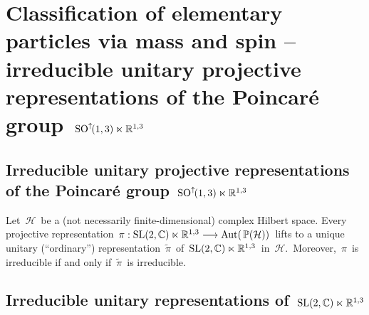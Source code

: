 

\chapter{Classification of elementary particles via mass and spin --
irreducible unitary projective representations of the Poincaré group \,$\textnormal{SO}^{\uparrow\!}(1,3) \ltimes \mathbb{R}^{1,3}$}
\setcounter{theorem}{0}
\setcounter{equation}{0}


\renewcommand{\theenumi}{\roman{enumi}}
\renewcommand{\labelenumi}{\textnormal{(\theenumi)}$\;\;$}


%
%
%
%
\vskip 1.0cm

%


\vskip 0.5cm
\section{Irreducible unitary projective representations of the Poincaré group \,$\textnormal{SO}^{\uparrow\!}(1,3) \ltimes \mathbb{R}^{1,3}$}

\vskip 0.3cm
\begin{theorem}
\mbox{}
\vskip 0.1cm
\noindent
Let \,$\mathcal{H}$\, be a (not necessarily finite-dimensional) complex Hilbert space.
Every projective representation
\,$\pi : \textnormal{SL}(2,\mathbb{C}) \ltimes \mathbb{R}^{1,3} \longrightarrow \textnormal{Aut}\!\left(\,\mathbb{P}(\mathcal{H})\right)$\,
lifts to a unique unitary (``ordinary'') representation
\,$\widetilde{\pi}$\, of \,$\textnormal{SL}(2,\mathbb{C}) \ltimes \mathbb{R}^{1,3}$\,
in \,$\mathcal{H}$.\,
Moreover, \,$\pi$\, is irreducible if and only if \,$\widetilde{\pi}$\, is irreducible.
\end{theorem}


\vskip 1.0cm
\section{Irreducible unitary representations of \,$\textnormal{SL}(2,\mathbb{C}) \ltimes \mathbb{R}^{1,3}$}

